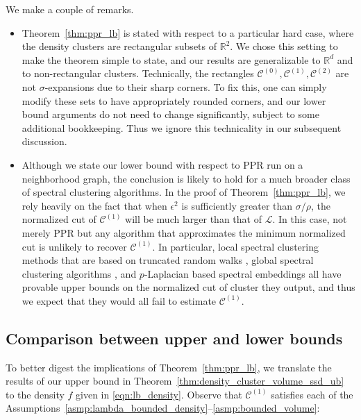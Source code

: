 \documentclass[11pt,twoside]{article}
\newcommand{\Reals}{\mathbb{R}}
\newcommand{\1}{\mathbf{1}}
\newcommand{\Rd}{\Reals^d}
\newcommand{\mc}[1]{\mathcal{#1}}
\begin{document}
We make a couple of remarks.
\begin{itemize}
	\item Theorem~\ref{thm:ppr_lb} is stated with respect to a particular hard case, where the density clusters are rectangular subsets of $\Reals^2$.  We chose this
	setting to make the theorem simple to state, and our results are generalizable
	to $\Rd$ and to non-rectangular clusters. Technically, the rectangles $\mc{C}^{(0)},\mc{C}^{(1)},\mc{C}^{(2)}$ are not
	$\sigma$-expansions due to their sharp corners. To fix this, one can   
	simply modify these sets to have appropriately rounded corners, and our lower
	bound arguments do not need to change significantly, subject to some
	additional bookkeeping.  Thus we ignore this technicality in our subsequent
	discussion. 
	
	\item Although we state our lower bound with respect to PPR run on a neighborhood graph, the conclusion is likely to hold for a much broader class of spectral clustering algorithms. In the proof of Theorem~\ref{thm:ppr_lb}, we rely heavily on the fact that when $\epsilon^2$ is sufficiently greater than $\sigma/\rho$, the normalized cut of $\mc{C}^{(1)}$ will be much larger than that of $\mc{L}$. In this case, not merely PPR but any algorithm that approximates the minimum normalized cut is unlikely to recover $\mc{C}^{(1)}$. In particular, local spectral clustering methods that are based on truncated random walks \citep{spielman2013}, global spectral clustering algorithms \citep{shi00}, and $p$-Laplacian based spectral embeddings \citep{hein2010} all have provable upper bounds on the normalized cut of cluster they output, and thus we expect that they would all fail to estimate $\mc{C}^{(1)}$.
\end{itemize}

\subsection{Comparison between upper and lower bounds}
\label{subsec:comparison_upper_lower_bounds}
To better digest the implications of Theorem~\ref{thm:ppr_lb}, we translate the
results of our upper bound in Theorem~\ref{thm:density_cluster_volume_ssd_ub} to the density $f$ given in \eqref{eqn:lb_density}. Observe that $\mc{C}^{(1)}$ satisfies each of the Assumptions~\ref{asmp:lambda_bounded_density}--\ref{asmp:bounded_volume}:
\end{document}
